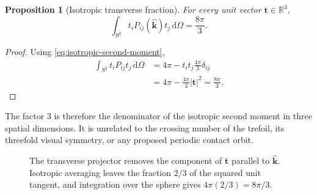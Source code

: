 \documentclass[aps,pre,preprint,notitlepage,nofootinbib,superscriptaddress]{revtex4-2}
\newcommand{\dd}{\mathrm d}
\newcommand{\RR}{\mathbb R}
\newcommand{\unitvec}[1]{\widehat{\bm #1}}
\newtheorem{proposition}{Proposition}
\begin{document}
\begin{proposition}[Isotropic transverse fraction]
For every unit vector $\bm t\in\RR^3$,
\begin{equation}
  \boxed{
  \int_{S^2}t_iP_{ij}(\unitvec{k})t_j\,\dd\Omega
  =\frac{8\pi}{3}.}
  \label{eq:8pi3}
\end{equation}
\end{proposition}

\begin{proof}
Using \cref{eq:isotropic-second-moment},
\begin{align}
  \int_{S^2}t_iP_{ij}t_j\,\dd\Omega
  &=4\pi-t_it_j\frac{4\pi}{3}\delta_{ij}\nonumber\\
  &=4\pi-\frac{4\pi}{3}|\bm t|^2
   =\frac{8\pi}{3}.
\end{align}
\end{proof}

The factor $3$ is therefore the denominator of the isotropic second moment in three spatial dimensions.  It is unrelated to the crossing number of the trefoil, its threefold visual symmetry, or any proposed periodic contact orbit.

\begin{figure}[t]
\centering
{}
\caption{The transverse projector removes the component of $\bm t$ parallel to $\unitvec{k}$.  Isotropic averaging leaves the fraction $2/3$ of the squared unit tangent, and integration over the sphere gives $4\pi(2/3)=8\pi/3$.}
\label{fig:projector}
\end{figure}
\end{document}
